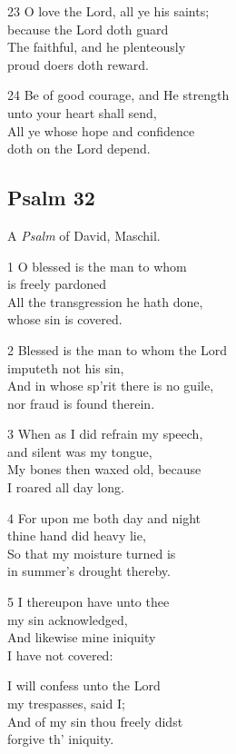 \begin{multicols}{3}
23 O love the Lord, all ye his saints;\\
because the Lord doth guard\\
The faithful, and he plenteously\\
proud doers doth reward.

24 Be of good courage, and He strength\\
unto your heart shall send,\\
All ye whose hope and confidence\\
doth on the Lord depend.

\begin{center}
\quad{}\quad{}
\end{center}

\subsection*{Psalm 32 }

A \emph{Psalm} of David, Maschil.

1 O blessed is the man to whom\\
is freely pardoned\\
All the transgression he hath done,\\
whose sin is covered.

2 Blessed is the man to whom the Lord\\
imputeth not his sin,\\
And in whose sp’rit there is no guile,\\
nor fraud is found therein.

3 When as I did refrain my speech,\\
and silent was my tongue,\\
My bones then waxed old, because\\
I roared all day long.

4 For upon me both day and night\\
thine hand did heavy lie,\\
So that my moisture turned is\\
in summer’s drought thereby.

5 I thereupon have unto thee\\
my sin acknowledged,\\
And likewise mine iniquity\\
I have not covered:

I will confess unto the Lord\\
my trespasses, said I;\\
And of my sin thou freely didst\\
forgive th’ iniquity.


\end{multicols}
